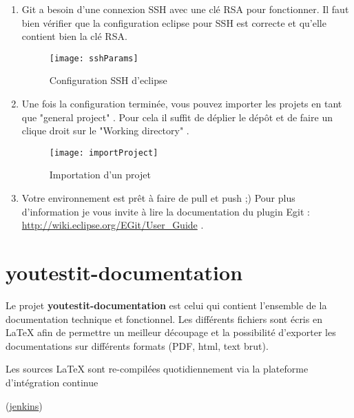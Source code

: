 \begin{enumerate}
	 \item Git a besoin d'une connexion SSH avec une clé RSA pour fonctionner. Il faut
	 bien vérifier que la configuration eclipse pour SSH est correcte et qu'elle contient
	 bien la clé RSA.
		\begin{figure}[!h]
     		\begin{center}
			      \texttt{[image: sshParams]}
			      \caption{Configuration SSH d'eclipse}
			      \label{eclipseSshConfig}
		    \end{center}
		\end{figure}		 
	 
	\item Une fois la configuration terminée, vous pouvez importer les projets en tant que "general project" .
	Pour cela il suffit de déplier le dépôt et de faire un clique droit sur le "Working directory" .
		\begin{figure}[!h]
     		\begin{center}
			      \texttt{[image: importProject]}
			      \caption{Importation d'un projet}
			      \label{gitProjectImport}
		    \end{center}
		\end{figure}	
		
	\item Votre environnement est prêt à faire de pull et push ;)   Pour plus  d'information je vous invite à lire la
	documentation du plugin Egit : \href{http://wiki.eclipse.org/EGit/User\_Guide}{http://wiki.eclipse.org/EGit/User\_Guide} . 
 
	 
\end{enumerate}

\section{youtestit-documentation}
Le projet \textbf{youtestit-documentation} est celui qui contient l'ensemble de la documentation
technique et fonctionnel. Les différents fichiers sont écris en LaTeX afin de permettre un meilleur
découpage et la possibilité d'exporter les documentations sur différents formats (PDF, html, text brut).


Les sources LaTeX sont re-compilées  quotidiennement  via la plateforme d'intégration continue

(\href{http://youtestit.org/jenkins/job/youtestit-documentation/}
		     {jenkins})

